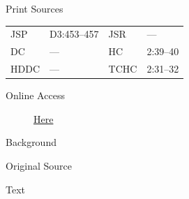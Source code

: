 			\begin{description}
					\item[Print Sources]
				\end{description}

					\begin{tabular}{p{0.5in}p{1in}p{0.5in}p{1in}}
					JSP	 	& D3:453--457		& JSR 		& --- \\
					DC	 	& --- 		& HC 		& 2:39--40 \\
					HDDC 	& ---		& TCHC 		& 2:31--32 \\
					\end{tabular}
				
				\begin{description}
					\item[Online Access] \href{https://www.josephsmithpapers.org/paper-summary/minutes-24-february-1834/1}{Here}
				\end{description}
				
				\begin{description}
					\item[Background]
				\end{description}
				
				
				\begin{description}
					\item[Original Source]
				\end{description}
				
				
				\begin{description}
					\item[Text]
				\end{description}
				
